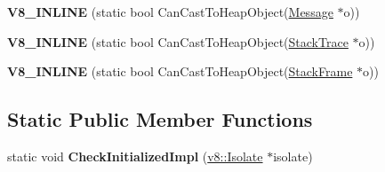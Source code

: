 \begin{DoxyCompactItemize}
\item 
\hypertarget{classv8_1_1internal_1_1_internals_a44c66d40648bb6d3168f2402917f5c9e}{}{\bfseries V8\+\_\+\+I\+N\+L\+I\+N\+E} (static bool Can\+Cast\+To\+Heap\+Object(\hyperlink{classv8_1_1_message}{Message} $\ast$o))\label{classv8_1_1internal_1_1_internals_a44c66d40648bb6d3168f2402917f5c9e}

\item 
\hypertarget{classv8_1_1internal_1_1_internals_ad0279acf4aa7efcc241504b960c10e12}{}{\bfseries V8\+\_\+\+I\+N\+L\+I\+N\+E} (static bool Can\+Cast\+To\+Heap\+Object(\hyperlink{classv8_1_1_stack_trace}{Stack\+Trace} $\ast$o))\label{classv8_1_1internal_1_1_internals_ad0279acf4aa7efcc241504b960c10e12}

\item 
\hypertarget{classv8_1_1internal_1_1_internals_a8ffcd387eb494753f0e0c2a526f7ca44}{}{\bfseries V8\+\_\+\+I\+N\+L\+I\+N\+E} (static bool Can\+Cast\+To\+Heap\+Object(\hyperlink{classv8_1_1_stack_frame}{Stack\+Frame} $\ast$o))\label{classv8_1_1internal_1_1_internals_a8ffcd387eb494753f0e0c2a526f7ca44}

\end{DoxyCompactItemize}
\subsection*{Static Public Member Functions}
\begin{DoxyCompactItemize}
\item 
\hypertarget{classv8_1_1internal_1_1_internals_a7ab121afc5229c0cced6fa96f020251c}{}static void {\bfseries Check\+Initialized\+Impl} (\hyperlink{classv8_1_1_isolate}{v8\+::\+Isolate} $\ast$isolate)\label{classv8_1_1internal_1_1_internals_a7ab121afc5229c0cced6fa96f020251c}

\end{DoxyCompactItemize}

